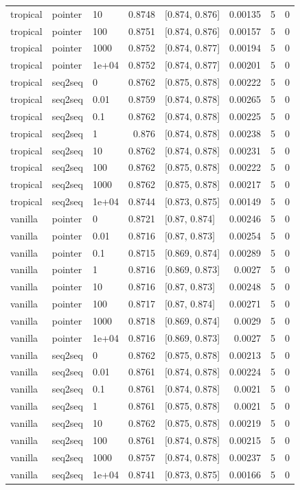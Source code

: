 \documentclass[10pt]{article}
\begin{document}
{\begin{longtable}{lllrlrrr}
tropical & pointer & 10 & 0.8748 & [0.874, 0.876] & 0.00135 & 5 & 0\\
tropical & pointer & 100 & 0.8751 & [0.874, 0.876] & 0.00157 & 5 & 0\\
tropical & pointer & 1000 & 0.8752 & [0.874, 0.877] & 0.00194 & 5 & 0\\
tropical & pointer & 1e+04 & 0.8752 & [0.874, 0.877] & 0.00201 & 5 & 0\\
tropical & seq2seq & 0 & 0.8762 & [0.875, 0.878] & 0.00222 & 5 & 0\\
tropical & seq2seq & 0.01 & 0.8759 & [0.874, 0.878] & 0.00265 & 5 & 0\\
tropical & seq2seq & 0.1 & 0.8762 & [0.874, 0.878] & 0.00225 & 5 & 0\\
tropical & seq2seq & 1 & 0.876 & [0.874, 0.878] & 0.00238 & 5 & 0\\
tropical & seq2seq & 10 & 0.8762 & [0.874, 0.878] & 0.00231 & 5 & 0\\
tropical & seq2seq & 100 & 0.8762 & [0.875, 0.878] & 0.00222 & 5 & 0\\
tropical & seq2seq & 1000 & 0.8762 & [0.875, 0.878] & 0.00217 & 5 & 0\\
tropical & seq2seq & 1e+04 & 0.8744 & [0.873, 0.875] & 0.00149 & 5 & 0\\
vanilla & pointer & 0 & 0.8721 & [0.87, 0.874] & 0.00246 & 5 & 0\\
vanilla & pointer & 0.01 & 0.8716 & [0.87, 0.873] & 0.00254 & 5 & 0\\
vanilla & pointer & 0.1 & 0.8715 & [0.869, 0.874] & 0.00289 & 5 & 0\\
vanilla & pointer & 1 & 0.8716 & [0.869, 0.873] & 0.0027 & 5 & 0\\
vanilla & pointer & 10 & 0.8716 & [0.87, 0.873] & 0.00248 & 5 & 0\\
vanilla & pointer & 100 & 0.8717 & [0.87, 0.874] & 0.00271 & 5 & 0\\
vanilla & pointer & 1000 & 0.8718 & [0.869, 0.874] & 0.0029 & 5 & 0\\
vanilla & pointer & 1e+04 & 0.8716 & [0.869, 0.873] & 0.0027 & 5 & 0\\
vanilla & seq2seq & 0 & 0.8762 & [0.875, 0.878] & 0.00213 & 5 & 0\\
vanilla & seq2seq & 0.01 & 0.8761 & [0.874, 0.878] & 0.00224 & 5 & 0\\
vanilla & seq2seq & 0.1 & 0.8761 & [0.874, 0.878] & 0.0021 & 5 & 0\\
vanilla & seq2seq & 1 & 0.8761 & [0.875, 0.878] & 0.0021 & 5 & 0\\
vanilla & seq2seq & 10 & 0.8762 & [0.875, 0.878] & 0.00219 & 5 & 0\\
vanilla & seq2seq & 100 & 0.8761 & [0.874, 0.878] & 0.00215 & 5 & 0\\
vanilla & seq2seq & 1000 & 0.8757 & [0.874, 0.878] & 0.00237 & 5 & 0\\
vanilla & seq2seq & 1e+04 & 0.8741 & [0.873, 0.875] & 0.00166 & 5 & 0\\
\bottomrule
\end{longtable}
}
\end{document}
